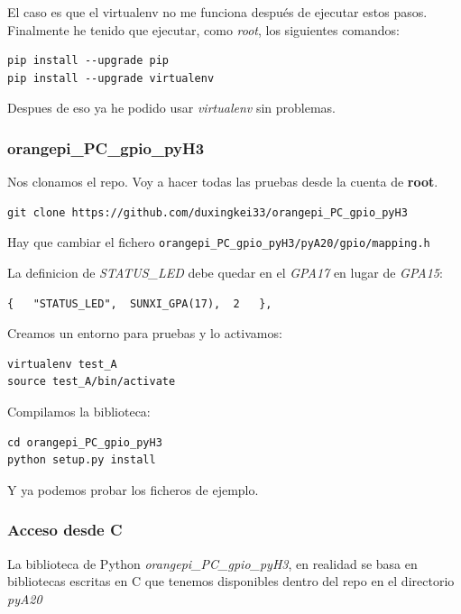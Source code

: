 \documentclass[12pt,spanish,]{scrartcl}
\begin{document}
El caso es que el virtualenv no me funciona después de ejecutar estos
pasos. Finalmente he tenido que ejecutar, como \emph{root}, los
siguientes comandos:

\begin{verbatim}
pip install --upgrade pip
pip install --upgrade virtualenv
\end{verbatim}

Despues de eso ya he podido usar \emph{virtualenv} sin problemas.

\subsubsection{orangepi\_PC\_gpio\_pyH3}\label{orangepi_pc_gpio_pyh3}

Nos clonamos el repo. Voy a hacer todas las pruebas desde la cuenta de
\textbf{root}.

\begin{verbatim}
git clone https://github.com/duxingkei33/orangepi_PC_gpio_pyH3
\end{verbatim}

Hay que cambiar el fichero
\texttt{orangepi\_PC\_gpio\_pyH3/pyA20/gpio/mapping.h}

La definicion de \emph{STATUS\_LED} debe quedar en el \emph{GPA17} en
lugar de \emph{GPA15}:

\begin{verbatim}
{   "STATUS_LED",  SUNXI_GPA(17),  2   },
\end{verbatim}

Creamos un entorno para pruebas y lo activamos:

\begin{verbatim}
virtualenv test_A
source test_A/bin/activate
\end{verbatim}

Compilamos la biblioteca:

\begin{verbatim}
cd orangepi_PC_gpio_pyH3
python setup.py install
\end{verbatim}

Y ya podemos probar los ficheros de ejemplo.

\subsubsection{Acceso desde C}\label{acceso-desde-c}

La biblioteca de Python \emph{orangepi\_PC\_gpio\_pyH3}, en realidad se
basa en bibliotecas escritas en C que tenemos disponibles dentro del
repo en el directorio \emph{pyA20}
\end{document}
